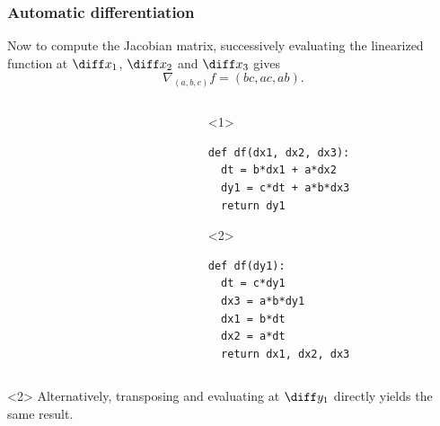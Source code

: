 \documentclass[10pt]{beamer}
\renewcommand{\emph}[1]{{\usebeamercolor[fg]{structure}#1}}
\begin{document}
\begin{frame}[fragile]
  \frametitle{Automatic differentiation}

  Now to compute the Jacobian matrix, successively evaluating the
  linearized function at $\diff x_1$, $\diff x_2$ and $\diff x_3$
  gives
  \[\nabla_{(a,b,c)}f = (bc, ac, ab).\]

  
  \begin{columns}
    \begin{column}{0.5\textwidth}
      \begin{figure}
        \centering
      \end{figure}
    \end{column}
    \begin{column}{0.5\textwidth}
      \centering
      \begin{onlyenv}<1>
\begin{lstlisting}
def df(dx1, dx2, dx3):
  dt = b*dx1 + a*dx2
  dy1 = c*dt + a*b*dx3
  return dy1
\end{lstlisting}
      \end{onlyenv}
      \begin{onlyenv}<2>
\begin{lstlisting}
def df(dy1):
  dt = c*dy1
  dx3 = a*b*dy1
  dx1 = b*dt
  dx2 = a*dt
  return dx1, dx2, dx3
\end{lstlisting}
      \end{onlyenv}
    \end{column}
  \end{columns}

  \bigskip

  \begin{uncoverenv}<2> Alternatively, transposing and evaluating at
    $\diff y_1$ \emph{directly} yields the same result.
  \end{uncoverenv}
\end{frame}
\end{document}
